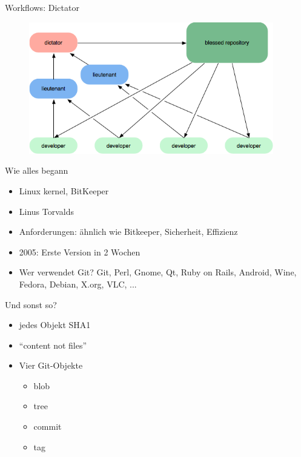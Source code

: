 \documentclass{beamer}
\begin{document}
\begin{frame}{Workflows: Dictator}
 
  \begin{figure}
     \includegraphics[width=0.95\textwidth]{./images/workflow-dictator.png}
  \end{figure}

\end{frame}


\begin{frame}{Wie alles begann}{}

  \begin{itemize}
    \item Linux kernel, BitKeeper
    \item Linus Torvalds
    \item Anforderungen: ähnlich wie Bitkeeper, Sicherheit, Effizienz
    \item 2005: Erste Version in 2 Wochen
    \item Wer verwendet Git? Git, Perl, Gnome, Qt, Ruby on Rails, Android, Wine, Fedora, Debian, X.org, VLC, ...
  \end{itemize}

\end{frame}

\begin{frame}{Und sonst so?}{}

  \begin{itemize}
    \item jedes Objekt SHA1
    \item ``content not files''
    \item Vier Git-Objekte
    \begin{itemize}
     \item blob
     \item tree
     \item commit
     \item tag
    \end{itemize}
  \end{itemize}

\end{frame}
\end{document}
